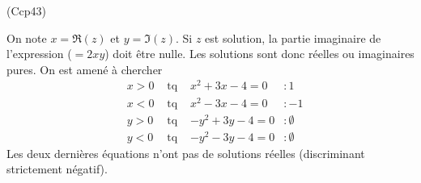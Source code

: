 \begin{tiny}(Ccp43)\end{tiny} On note $x=\Re(z)$ et $y=\Im(z)$. Si $z$ est solution, la partie imaginaire de l'expression ($=2xy$) doit être nulle. Les solutions sont donc réelles ou imaginaires pures. On est amené à chercher
\begin{align*}
 &x>0 &\text{ tq }& x^2 + 3x - 4 =0  &: 1\\
 &x<0 &\text{ tq }& x^2 - 3x - 4 =0  &: -1\\
 &y>0 &\text{ tq }& -y^2 + 3y - 4 =0 &: \emptyset\\
 &y<0 &\text{ tq }& -y^2 - 3y - 4 =0 &: \emptyset
\end{align*}
Les deux dernières équations n'ont pas de solutions réelles (discriminant strictement négatif).
